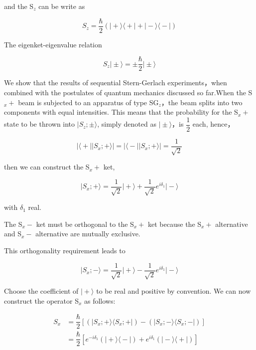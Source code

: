 \documentclass[a4paper]{article}
\newcommand{\ket}[1]{\big|  #1 \big \rangle }
\newcommand{\bra}[1]{ \big\langle #1 \big | }
\begin{document}
and the S$ _z $ can be write as

\begin{equation}
S_z = \dfrac{\hbar}{2} (\ket{+} \bra{+} + \ket{-} \bra{-})
\end{equation}

The eigenket-eigenvalue relation

\begin{equation}
S_z \ket{\pm} = \pm \dfrac{\hbar}{2} \ket{\pm}
\end{equation}

We show that the results of sequential Stern-Gerlach experiments，when combined with the postulates of quantum mechanics discussed so far.When the S$ _x+ $ beam is subjected to an apparatus of type SG$ _z $，the beam splits into two components with equal intensities. This means that the probability for the S$ _x+ $ state to be thrown into $\ket{S_z;\pm}$, simply denoted as $\ket{\pm}$，is $ \dfrac{1}{2} $ each, hence，

\begin{equation} 
|\bra{+} \ket{S_x;+}| = |\bra{-} \ket{S_x;+}| = \dfrac{1}{\sqrt{2}}
\end{equation}

then we can construct the S$ _x+ $ ket,

\begin{equation}
\ket{S_x;+} = \dfrac{1}{\sqrt{2}} \ket{+} + \dfrac{1}{\sqrt{2}} e^{i \delta_1} \ket{-}
\end{equation}

with $ \delta_1 $ real.

The S$ _x- $ ket must be orthogonal to the S$ _x+ $ ket because the S$ _x+ $ alternative and S$ _x- $ alternative are mutually exclusive. 

This orthogonality requirement leads to

\begin{equation}
\ket{S_x;-} = \dfrac{1}{\sqrt{2}} \ket{+} - \dfrac{1}{\sqrt{2}} e^{i \delta_1} \ket{-}
\end{equation}

Choose the coefficient of $ \ket{+} $ to be real and positive by convention. We can now construct the operator S$ _x $ as follows:

\begin{align*}
S_x &= \dfrac{\hbar}{2} [(\ket{S_x;+} \bra{S_x;+})-(\ket{S_x;-} \bra{S_x;-})] \\
&= \dfrac{\hbar}{2} [e^{-i\delta_1}(\ket{+} \bra{-})+e^{i\delta_1}(\ket{-} \bra{+})]
\end{align*}
\end{document}

